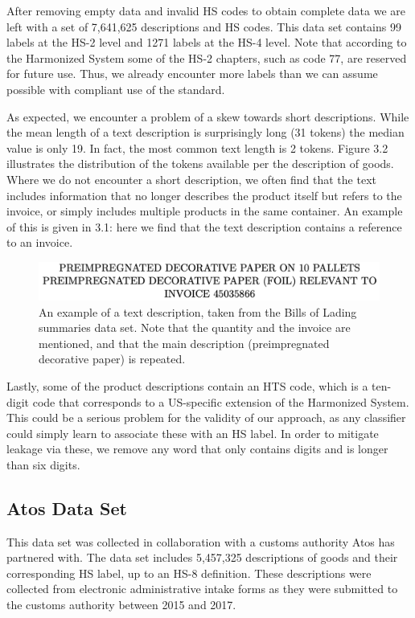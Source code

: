 After removing empty data and invalid HS codes to obtain complete data we are left with a set of 7,641,625 descriptions and HS codes. This data set contains 99 labels at the HS-2 level and 1271 labels at the HS-4 level. Note that according to the Harmonized System some of the HS-2 chapters, such as code 77, are reserved for future use. Thus, we already encounter more labels than we can assume possible with compliant use of the standard.

As expected, we encounter a problem of a skew towards short descriptions. While the mean length of a text description is surprisingly long (31 tokens) the median value is only 19. In fact, the most common text length is 2 tokens. Figure 3.2 illustrates the distribution of the tokens available per the description of goods.\\

Where we do not encounter a short description, we often find that the text includes information that no longer describes the product itself but refers to the invoice, or simply includes multiple products in the same container. An example of this is given in 3.1: here we find that the text description contains a reference to an invoice.

\begin{figure}[h]
    \centering
    \includegraphics[width=1\textwidth]{bol1.png}
    \caption{An example of a text description, taken from the Bills of Lading summaries data set. Note that the quantity and the invoice are mentioned, and that the main description (preimpregnated decorative paper) is repeated.}
    \label{fig:eg BOL}
\end{figure}

Lastly, some of the product descriptions contain an HTS code, which is a ten-digit code that corresponds to a US-specific extension of the Harmonized System. This could be a serious problem for the validity of our approach, as any classifier could simply learn to associate these with an HS label. In order to mitigate leakage via these, we remove any word that only contains digits and is longer than six digits.

\subsection{Atos Data Set}
This data set was collected in collaboration with a customs authority Atos has partnered with. The data set includes 5,457,325 descriptions of goods and their corresponding HS label, up to an HS-8 definition. These descriptions were collected from electronic administrative intake forms as they were submitted to the customs authority between 2015 and 2017. 


